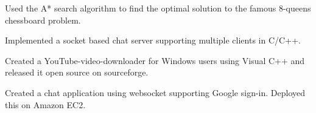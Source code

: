 



\begin{cventries}

\cvproject
{
    \begin{cvitems} %
        \item {Used the A* search algorithm to find the optimal solution to the famous 8-queens chessboard problem.}
        \item {Implemented a socket based chat server supporting multiple clients in C/C++.}
        \item {Created a YouTube-video-downloader for Windows users using Visual C++ and released it open source on sourceforge.}
        \item {Created a chat application using websocket supporting Google sign-in. Deployed this on Amazon EC2.}
        \end{cvitems}
}

\end{cventries}